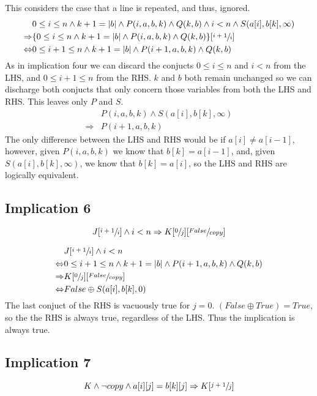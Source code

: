\documentclass[a4paper]{article}
\begin{document}
This considers the case that a line is repeated, and thus, ignored.
\begin{align*}
		& 0 \leq i \leq n \land k + 1 = |b| \land P(i, a, b, k) \land Q(k, b) \land i < n \land S(a[i], b[k], \infty) \\ 
		\Rightarrow & \{0 \leq i \leq n \land k + 1 = |b| \land P(i, a, b, k) \land Q(k, b) \}[\sfrac{i+1}{i}]\\ 
		\Leftrightarrow & 0 \leq i + 1 \leq n \land k + 1 = |b| \land P(i+1, a, b, k) \land Q(k, b) 
\end{align*}
As in implication four we can discard the conjucts $0 \leq i \leq n$ and $i < n$ from the LHS, and $0 \leq i + 1 \leq n$ from the RHS. $k$ and $b$ both remain unchanged so we can discharge both conjucts that only concern those variables from both the LHS and RHS. This leaves only $P$ and $S$.
\begin{align*}
		& P(i, a, b, k) \land S(a[i], b[k], \infty) \\
		\Rightarrow & P(i+1, a, b, k)
\end{align*}
The only difference between the LHS and RHS would be if $a[i] \neq a[i-1]$, however, given $P(i, a, b, k)$ we know that $b[k] = a[i-1]$, and, given $S(a[i], b[k], \infty)$, we know that $b[k] = a[i]$, so the LHS and RHS are logically equivalent.

\subsection{Implication 6}
$$ J[\sfrac{i+1}{i}] \land i < n \Rightarrow K[\sfrac{0}{j}][\sfrac{False}{copy}] $$

\begin{align*}
		& J[\sfrac{i+1}{i}] \land i < n \\
		\Leftrightarrow & 0 \leq i + 1 \leq n \land k + 1 = |b| \land P(i + 1, a, b, k) \land Q(k, b) \\
		\Rightarrow & K[\sfrac{0}{j}][\sfrac{False}{copy}] \\
		\Leftrightarrow & False \oplus S(a[i], b[k], 0)
\end{align*}
The last conjuct of the RHS is vacuously true for $j=0$. $(False \oplus True) = True$, so the the RHS is always true, regardless of the LHS. Thus the implication is always true.


\subsection{Implication 7}
$$ K \land \neg copy \land a[i][j] = b[k][j] \Rightarrow K[\sfrac{j+1}{j}] $$
\end{document}
